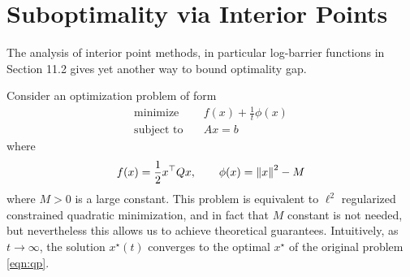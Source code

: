 \documentclass[12pt]{article}
\begin{document}
\section{Suboptimality via Interior Points}

The analysis of interior point methods, in particular log-barrier functions
in~\cite{boyd2004convex} Section 11.2
gives yet another way to bound optimality gap.

Consider an optimization problem of form
\begin{align}
  \text{minimize}&\quad f(x) + \frac{1}{t} \phi(x) \label{eqn:fake-barrier} \\
  \text{subject to}&\quad Ax = b \nonumber
\end{align}
where
\begin{align*}
  f(x) = \frac{1}{2} x^\top Q x,
    \qquad \phi(x) = {\left\lVert x\right\rVert}^2 - M
\end{align*}
where \(M > 0\) is a large constant.
This problem is equivalent to \(\ell^2\) regularized constrained
quadratic minimization,
and in fact that \(M\) constant is not needed, but nevertheless
this allows us to achieve theoretical guarantees.
Intuitively, as \(t \to \infty\),
the solution \(x^\star (t)\) converges to the optimal \(x^\star\)
of the original problem \eqref{eqn:qp}.
\end{document}
